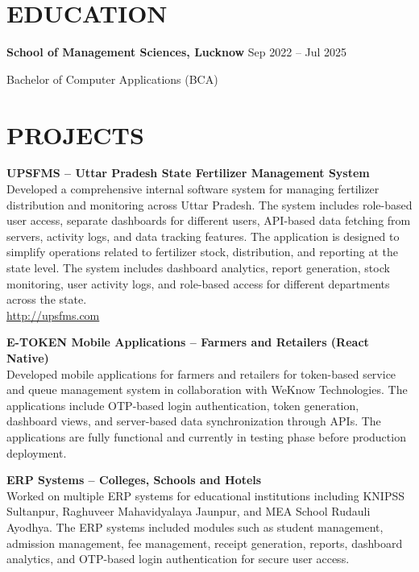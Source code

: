 \documentclass[a4paper,10.9pt]{article}
\begin{document}

\section*{EDUCATION}

\textbf{School of Management Sciences, Lucknow} \hfill Sep 2022 -- Jul 2025

Bachelor of Computer Applications (BCA)

\newpage


\section*{PROJECTS}

\textbf{UPSFMS – Uttar Pradesh State Fertilizer Management System} \\
Developed a comprehensive internal software system for managing fertilizer distribution and monitoring across Uttar Pradesh. The system includes role-based user access, separate dashboards for different users, API-based data fetching from servers, activity logs, and data tracking features. The application is designed to simplify operations related to fertilizer stock, distribution, and reporting at the state level. The system includes dashboard analytics, report generation, stock monitoring, user activity logs, and role-based access for different departments across the state. \\
\href{http://upsfms.com}{http://upsfms.com}

\vspace{5pt}

\textbf{E-TOKEN Mobile Applications – Farmers and Retailers (React Native)} \\
Developed mobile applications for farmers and retailers for token-based service and queue management system in collaboration with WeKnow Technologies. The applications include OTP-based login authentication, token generation, dashboard views, and server-based data synchronization through APIs. The applications are fully functional and currently in testing phase before production deployment.

\vspace{5pt}

\textbf{ERP Systems – Colleges, Schools and Hotels} \\
Worked on multiple ERP systems for educational institutions including KNIPSS Sultanpur, Raghuveer Mahavidyalaya Jaunpur, and MEA School Rudauli Ayodhya. The ERP systems included modules such as student management, admission management, fee management, receipt generation, reports, dashboard analytics, and OTP-based login authentication for secure user access. 
\end{document}

